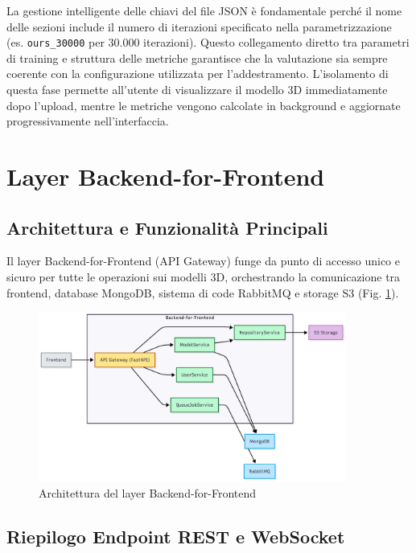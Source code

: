 La gestione intelligente delle chiavi del file JSON è fondamentale perché il nome delle sezioni include il numero di iterazioni specificato nella parametrizzazione (es. \texttt{ours\_30000} per 30.000 iterazioni). Questo collegamento diretto tra parametri di training e struttura delle metriche garantisce che la valutazione sia sempre coerente con la configurazione utilizzata per l'addestramento. L'isolamento di questa fase permette all'utente di visualizzare il modello 3D immediatamente dopo l'upload, mentre le metriche vengono calcolate in background e aggiornate progressivamente nell'interfaccia.

\section{Layer Backend-for-Frontend}

\subsection{Architettura e Funzionalità Principali}

Il layer Backend-for-Frontend (API Gateway) funge da punto di accesso unico e sicuro per tutte le operazioni sui modelli 3D, orchestrando la comunicazione tra frontend, database MongoDB, sistema di code RabbitMQ e storage S3 (Fig. \ref{fig:bff_architecture}).

\begin{figure}[H]
	\centering
	\includegraphics[width=0.9\textwidth]{images/bff_architecture.jpg}
	\caption{Architettura del layer Backend-for-Frontend}
	\label{fig:bff_architecture}
\end{figure}

\subsection{Riepilogo Endpoint REST e WebSocket}

